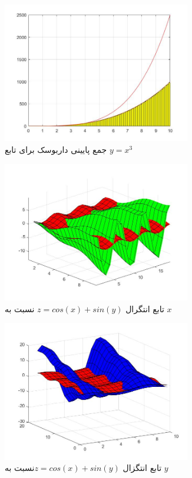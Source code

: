 \documentclass{article}
\begin{document}
\begin{figure}[!h]
    \centering
\includegraphics[width=8.2cm]{pic16codeIntegral.jpg}
    \caption{جمع پایینی داربوسک برای تابع $y=x^3$}
    \label{fig:انتگرال خط}
\end{figure}

\pagebreak

\begin{figure}[!h]
    \centering
\includegraphics[width=8.2cm]{pic17codeIntegral.jpg}
    \caption{تابع انتگرال $z=cos(x)+sin(y)$ نسبت به  $x$}
    \label{fig:انتگرال خط}
\end{figure}


\begin{figure}[!h]
    \centering
\includegraphics[width=8.2cm]{pic18codeIntegral.jpg}
  \caption{تابع انتگزال $z=cos(x)+sin(y)$نسبت به $y$}
    \label{fig:انتگرال خط}
\end{figure}
\end{document}
